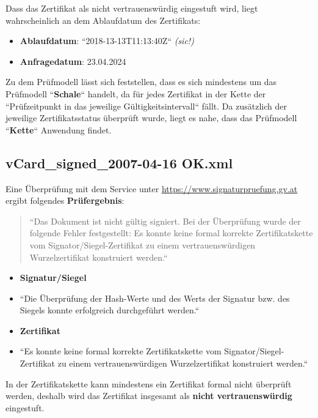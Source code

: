 \noindent
Dass das Zertifikat als nicht vertrauenswürdig eingestuft wird, liegt wahrscheinlich an dem Ablaufdatum des Zertifikats:

\begin{itemize}
    \itemsep0.5em
    \item \textbf{Ablaufdatum}: ``2018-13-13T11:13:40Z``  \textit{(sic!)}
    \item \textbf{Anfragedatum}: 23.04.2024
\end{itemize}

\noindent
Zu dem Prüfmodell lässt sich feststellen, dass es sich mindestens um das Prüfmodell ``\textbf{Schale}`` handelt, da für jedes Zertifikat in der Kette der ``Prüfzeitpunkt in das jeweilige Gültigkeitsintervall`` fällt.
Da zusätzlich der jeweilige Zertifikatsstatus überprüft wurde, liegt es nahe, dass das Prüfmodell ``\textbf{Kette}`` Anwendung findet.

\subsection*{vCard\_signed\_2007-04-16 OK.xml}

Eine Überprüfung mit dem Service unter \url{https://www.signaturpruefung.gv.at} ergibt folgendes \textbf{Prüfergebnis}:

\blockquote[]{
    ``Das Dokument ist nicht gültig signiert. Bei der Überprüfung wurde der folgende Fehler festgestellt: Es konnte keine formal korrekte Zertifikatskette vom Signator/Siegel-Zertifikat zu einem vertrauenswürdigen Wurzelzertifikat konstruiert werden.``
}

\begin{itemize}
    \itemsep0.5em
    \item \textbf{Signatur/Siegel}
    \item[] ``Die Überprüfung der Hash-Werte und des Werts der Signatur bzw. des Siegels konnte erfolgreich durchgeführt werden.``
    \item \textbf{Zertifikat}
    \item[] ``Es konnte keine formal korrekte Zertifikatskette vom Signator/Siegel-Zertifikat zu einem vertrauenswürdigen Wurzelzertifikat konstruiert werden.``
\end{itemize}

\noindent
In der Zertifikatskette kann mindestens ein Zertifikat formal nicht überprüft werden, deshalb wird das Zertifikat insgesamt als \textbf{nicht vertrauenswürdig} eingestuft.\\

